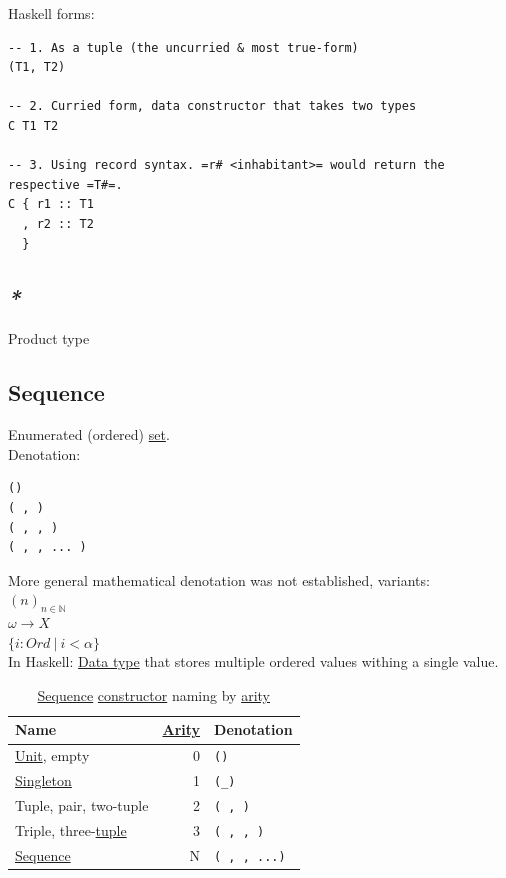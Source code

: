 \documentclass[a4paper,14pt,oneside]{book}
\begin{document}
{Haskell forms:\\
\begin{verbatim}
-- 1. As a tuple (the uncurried & most true-form)
(T1, T2)

-- 2. Curried form, data constructor that takes two types
C T1 T2

-- 3. Using record syntax. =r# <inhabitant>= would return the respective =T#=.
C { r1 :: T1
  , r2 :: T2
  }
\end{verbatim}

\subsection{\emph{*}}
\label{sec:orgeb19f26}

\label{org1315985}Product type\\

\subsection{\label{org3e94228}Sequence}
\label{sec:org6f6e316}
Enumerated (ordered) \hyperref[org0726f94]{set}.\\

Denotation:\\
\begin{verbatim}
()
( , )
( , , )
( , , ... )
\end{verbatim}

More general mathematical denotation was not established, variants:\\
\((n)_{n \in \mathbb{N}}\)\\
\(\omega \to X\)\\
\(\{ i:Ord \ | \ i < \alpha \}\)\\

In Haskell: \hyperref[org3de168a]{Data type} that stores multiple ordered values withing a single value.\\

\begin{table}[htbp]
\caption{\label{tab--sequence-names}\hyperref[org3e94228]{Sequence} \hyperref[org7a94df0]{constructor} naming by \hyperref[org8848356]{arity}}
\centering
\begin{tabu} spread \linewidth {lrl}
\toprule
Name & \hyperref[org8848356]{Arity} & Denotation\\
\midrule
\hyperref[org8df8d1c]{Unit}, empty & 0 & \texttt{()}\\
\hyperref[orgc9b37a8]{Singleton} & 1 & \texttt{(\_)}\\
\label{org666c273}Tuple, pair, \label{org3a712f1}two-tuple & 2 & \texttt{( , )}\\
\label{org8d03980}Triple, three-\hyperref[org666c273]{tuple} & 3 & \texttt{( , , )}\\
\hyperref[org3e94228]{Sequence} & N & \texttt{( , , ...)}\\
\bottomrule
\end{tabu}
\end{table}

}
\end{document}
